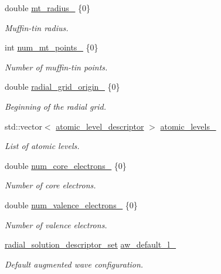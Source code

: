 \begin{DoxyCompactItemize}
double \hyperlink{classsirius_1_1_atom__type_a2d7ed2ae5ecbbc38dc3eae62dbff4c21}{mt\+\_\+radius\+\_\+} \{0\}
\begin{DoxyCompactList}\small\item\em Muffin-\/tin radius. \end{DoxyCompactList}\item 
int \hyperlink{classsirius_1_1_atom__type_a75389b693e7d82d6a64ccefa9060e9a8}{num\+\_\+mt\+\_\+points\+\_\+} \{0\}
\begin{DoxyCompactList}\small\item\em Number of muffin-\/tin points. \end{DoxyCompactList}\item 
double \hyperlink{classsirius_1_1_atom__type_aea51b36d134b6b1253f52baf4b85f613}{radial\+\_\+grid\+\_\+origin\+\_\+} \{0\}
\begin{DoxyCompactList}\small\item\em Beginning of the radial grid. \end{DoxyCompactList}\item 
std\+::vector$<$ \hyperlink{structatomic__level__descriptor}{atomic\+\_\+level\+\_\+descriptor} $>$ \hyperlink{classsirius_1_1_atom__type_a0cdf5c6087f404ca30ce1601a57c5db8}{atomic\+\_\+levels\+\_\+}
\begin{DoxyCompactList}\small\item\em List of atomic levels. \end{DoxyCompactList}\item 
double \hyperlink{classsirius_1_1_atom__type_a82db9b4154e9e293353036e2b7c901ab}{num\+\_\+core\+\_\+electrons\+\_\+} \{0\}
\begin{DoxyCompactList}\small\item\em Number of core electrons. \end{DoxyCompactList}\item 
double \hyperlink{classsirius_1_1_atom__type_afa5cc846e55d43ea12344f8130da0e0e}{num\+\_\+valence\+\_\+electrons\+\_\+} \{0\}
\begin{DoxyCompactList}\small\item\em Number of valence electrons. \end{DoxyCompactList}\item 
\hyperlink{descriptors_8h_aec4b6e691d842d5c6b06552800a478b3}{radial\+\_\+solution\+\_\+descriptor\+\_\+set} \hyperlink{classsirius_1_1_atom__type_acfb62480282cfbcb162daf39a43683d5}{aw\+\_\+default\+\_\+l\+\_\+}
\begin{DoxyCompactList}\small\item\em Default augmented wave configuration. \end{DoxyCompactList}\item 

\end{DoxyCompactItemize}
